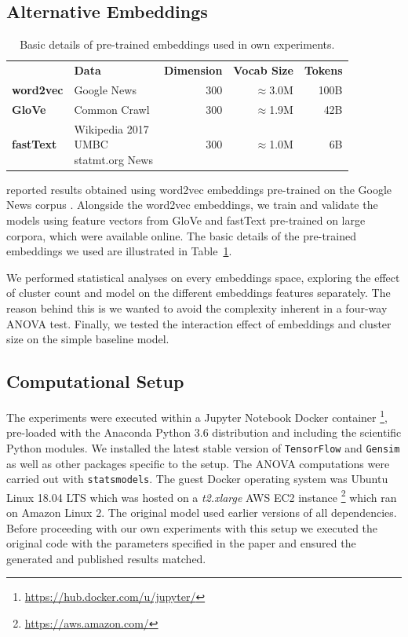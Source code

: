 \subsection{Alternative Embeddings}
\begin{table}\centering
    \begin{tabular}{@{}llrrr@{}} \toprule
    & \textbf{Data} & \textbf{Dimension} & \textbf{Vocab Size} & \textbf{Tokens} \\ \cmidrule{2-5}
    \textbf{word2vec} & Google News & 300 & $\approx$3.0M & 100B \\ \midrule
    \textbf{GloVe} & Common Crawl & 300 & $\approx$1.9M & 42B \\ \midrule
    \textbf{fastText} & \shortstack[l]{Wikipedia 2017\\UMBC\\statmt.org News} & 300 & $\approx$1.0M & 6B \\
    \bottomrule
    \end{tabular}
    \caption{Basic details of pre-trained embeddings used in own experiments.}\label{tab:experiment_embeddings}
\end{table}

\citeauthor{ustalov2017negative} reported results obtained using word2vec embeddings pre-trained on the Google News corpus \citep{mikolov2013efficient}.  Alongside the word2vec embeddings, we train and validate the models using feature vectors from GloVe \citep{pennington2014glove} and fastText \citep{bojanowski2017enriching} pre-trained on large corpora, which were available online.  The basic details of the pre-trained embeddings we used are illustrated in Table~\ref{tab:experiment_embeddings}.

We performed statistical analyses on every embeddings space, exploring the effect of cluster count and model on the different embeddings features separately.  The reason behind this is we wanted to avoid the complexity inherent in a four-way \ac{ANOVA} test.  Finally, we tested the interaction effect of embeddings and cluster size on the simple baseline model.

\subsection{Computational Setup} \label{computational_setup_orig}
The experiments were executed within a Jupyter Notebook Docker container \footnote{\url{https://hub.docker.com/u/jupyter/}}, pre-loaded with the Anaconda Python 3.6 distribution and including the scientific Python modules.  We installed the latest stable version of \texttt{TensorFlow} \citep{tensorflow2015-whitepaper} and \texttt{Gensim} \citep{rehurek_lrec} as well as other packages specific to the \citep{ustalov2017negative} setup.  The \ac{ANOVA} computations were carried out with \texttt{statsmodels}.
The guest Docker operating system was Ubuntu Linux 18.04 LTS which was hosted on a \textit{t2.xlarge} AWS EC2 instance \footnote{\url{https://aws.amazon.com/}} which ran on Amazon Linux 2.  The original model used earlier versions of all dependencies.  Before proceeding with our own experiments with this setup we executed the original code with the parameters specified in the paper and ensured the generated and published results matched.

